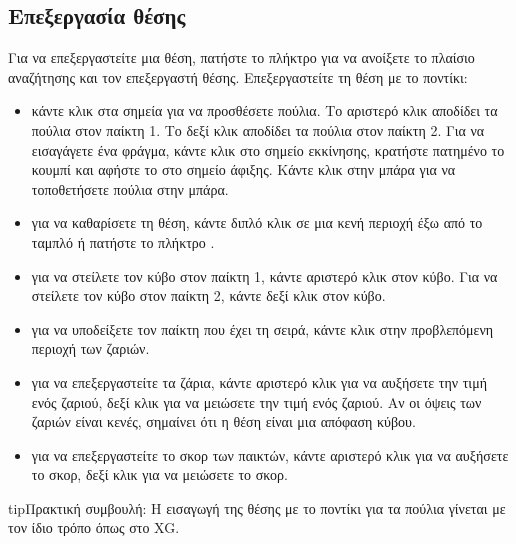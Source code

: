 \documentclass[letterpaper,10pt,greek]{sphinxmanual}
\begin{document}
\subsection{Επεξεργασία θέσης}
\label{\detokenize{guide_utilisateur:editer-une-position}}\label{\detokenize{guide_utilisateur:guide-edit-position}}
\sphinxAtStartPar
Για να επεξεργαστείτε μια θέση, πατήστε το πλήκτρο  για να ανοίξετε το πλαίσιο αναζήτησης και τον επεξεργαστή θέσης. Επεξεργαστείτε τη θέση με το ποντίκι:
\begin{itemize}
\item {} 
\sphinxAtStartPar
κάντε κλικ στα σημεία για να προσθέσετε πούλια. Το αριστερό κλικ αποδίδει τα πούλια στον παίκτη 1. Το δεξί κλικ αποδίδει τα πούλια στον παίκτη 2. Για να εισαγάγετε ένα φράγμα, κάντε κλικ στο σημείο εκκίνησης, κρατήστε πατημένο το κουμπί και αφήστε το στο σημείο άφιξης. Κάντε κλικ στην μπάρα για να τοποθετήσετε πούλια στην μπάρα.

\item {} 
\sphinxAtStartPar
για να καθαρίσετε τη θέση, κάντε διπλό κλικ σε μια κενή περιοχή έξω από το ταμπλό ή πατήστε το πλήκτρο .

\item {} 
\sphinxAtStartPar
για να στείλετε τον κύβο στον παίκτη 1, κάντε αριστερό κλικ στον κύβο. Για να στείλετε τον κύβο στον παίκτη 2, κάντε δεξί κλικ στον κύβο.

\item {} 
\sphinxAtStartPar
για να υποδείξετε τον παίκτη που έχει τη σειρά, κάντε κλικ στην προβλεπόμενη περιοχή των ζαριών.

\item {} 
\sphinxAtStartPar
για να επεξεργαστείτε τα ζάρια, κάντε αριστερό κλικ για να αυξήσετε την τιμή ενός ζαριού, δεξί κλικ για να μειώσετε την τιμή ενός ζαριού. Αν οι όψεις των ζαριών είναι κενές, σημαίνει ότι η θέση είναι μια απόφαση κύβου.

\item {} 
\sphinxAtStartPar
για να επεξεργαστείτε το σκορ των παικτών, κάντε αριστερό κλικ για να αυξήσετε το σκορ, δεξί κλικ για να μειώσετε το σκορ.

\end{itemize}

\begin{sphinxadmonition}{tip}{Πρακτική συμβουλή:}
\sphinxAtStartPar
Η εισαγωγή της θέσης με το ποντίκι για τα πούλια γίνεται με τον ίδιο τρόπο όπως στο XG.
\end{sphinxadmonition}
\end{document}
